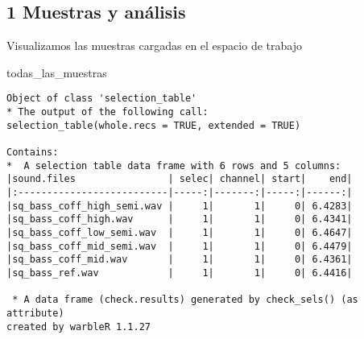 \documentclass[
]{article}
\newenvironment{Shaded}{\begin{snugshade}}{\end{snugshade}}
\newcommand{\AttributeTok}[1]{\textcolor[rgb]{0.77,0.63,0.00}{#1}}
\newcommand{\DecValTok}[1]{\textcolor[rgb]{0.00,0.00,0.81}{#1}}
\newcommand{\FloatTok}[1]{\textcolor[rgb]{0.00,0.00,0.81}{#1}}
\newcommand{\FunctionTok}[1]{\textcolor[rgb]{0.00,0.00,0.00}{#1}}
\newcommand{\NormalTok}[1]{#1}
\newcommand{\OtherTok}[1]{\textcolor[rgb]{0.56,0.35,0.01}{#1}}
\newcommand{\SpecialCharTok}[1]{\textcolor[rgb]{0.00,0.00,0.00}{#1}}
\newcommand{\StringTok}[1]{\textcolor[rgb]{0.31,0.60,0.02}{#1}}
\begin{document}
\begin{Shaded}
\end{Shaded}

\begin{Shaded}
\end{Shaded}

\newpage

\hypertarget{muestras-y-anuxe1lisis}{%
\subsection{1 Muestras y análisis}\label{muestras-y-anuxe1lisis}}

Visualizamos las muestras cargadas en el espacio de trabajo

\begin{Shaded}
\begin{Highlighting}[]
\NormalTok{todas\_las\_muestras }
\end{Highlighting}
\end{Shaded}

\begin{verbatim}
Object of class 'selection_table' 
* The output of the following call: 
selection_table(whole.recs = TRUE, extended = TRUE) 

Contains: 
*  A selection table data frame with 6 rows and 5 columns: 
|sound.files                | selec| channel| start|    end|
|:--------------------------|-----:|-------:|-----:|------:|
|sq_bass_coff_high_semi.wav |     1|       1|     0| 6.4283|
|sq_bass_coff_high.wav      |     1|       1|     0| 6.4341|
|sq_bass_coff_low_semi.wav  |     1|       1|     0| 6.4647|
|sq_bass_coff_mid_semi.wav  |     1|       1|     0| 6.4479|
|sq_bass_coff_mid.wav       |     1|       1|     0| 6.4361|
|sq_bass_ref.wav            |     1|       1|     0| 6.4416|

 * A data frame (check.results) generated by check_sels() (as attribute) 
created by warbleR 1.1.27
\end{verbatim}
\end{document}
